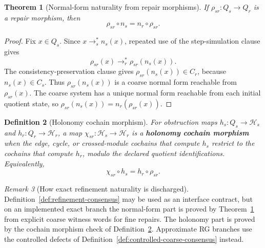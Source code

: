 \documentclass[11pt]{article}
\newtheorem{theorem}{Theorem}[section]
\newtheorem{definition}[theorem]{Definition}
\theoremstyle{remark}
\newtheorem{remark}[theorem]{Remark}
\theoremstyle{plain}
\begin{document}
\begin{theorem}[Normal-form naturality from repair morphisms]\label{thm:repair-morphism-naturality}
If \(\rho_{sr}:Q_s\to Q_r\) is a repair morphism, then
\[
\rho_{sr}\circ n_s=n_r\circ\rho_{sr}.
\]
\end{theorem}

\begin{proof}
Fix \(x\in Q_s\). Since \(x\to_s^* n_s(x)\), repeated use of the step-simulation clause gives
\[
\rho_{sr}(x)\to_r^*\rho_{sr}(n_s(x)).
\]
The consistency-preservation clause gives \(\rho_{sr}(n_s(x))\in C_r\), because
\(n_s(x)\in C_s\). Thus \(\rho_{sr}(n_s(x))\) is a coarse normal form reachable from
\(\rho_{sr}(x)\). The coarse system has a unique normal form reachable from each initial quotient
state, so \(\rho_{sr}(n_s(x))=n_r(\rho_{sr}(x))\).
\end{proof}

\begin{definition}[Holonomy cochain morphism]\label{def:holonomy-cochain-morphism}
For obstruction maps \(h_s:Q_s\to\mathcal H_s\) and \(h_r:Q_r\to\mathcal H_r\), a map
\(\chi_{sr}:\mathcal H_s\to\mathcal H_r\) is a \textbf{holonomy cochain morphism} when the
edge, cycle, or crossed-module cochains that compute \(h_s\) restrict to the cochains that compute
\(h_r\), modulo the declared quotient identifications. Equivalently,
\[
\chi_{sr}\circ h_s=h_r\circ\rho_{sr}.
\]
\end{definition}

\begin{remark}[How exact refinement naturality is discharged]\label{rem:exact-naturality-discharge}
Definition~\ref{def:refinement-consensus} may be used as an interface contract, but on an
implemented exact branch the normal-form part is proved by Theorem~\ref{thm:repair-morphism-naturality}
from explicit coarse witness words for fine repairs. The holonomy part is proved by the cochain
morphism check of Definition~\ref{def:holonomy-cochain-morphism}. Approximate RG branches use the
controlled defects of Definition~\ref{def:controlled-coarse-consensus} instead.
\end{remark}
\end{document}
